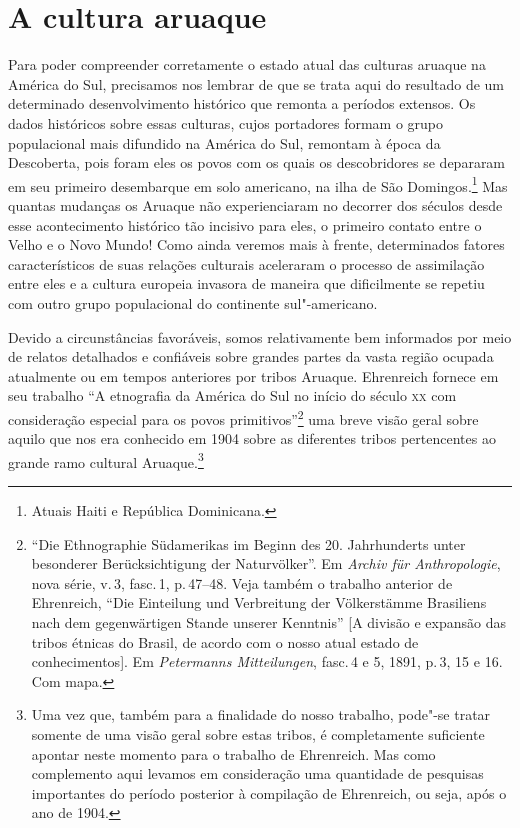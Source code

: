 
\chapter*{A cultura aruaque\smallskip{}}

Para poder compreender corretamente o estado atual das culturas aruaque
na América do Sul, precisamos nos lembrar de que se trata aqui do
resultado de um determinado desenvolvimento histórico que remonta a
períodos extensos. Os dados históricos sobre essas culturas, cujos
portadores formam o grupo populacional mais difundido na América do Sul,
remontam à época da Descoberta, pois foram eles os povos com os quais os
descobridores se depararam em seu primeiro desembarque em solo americano,
na ilha de São Domingos.\footnote{Atuais Haiti e República Dominicana.} Mas quantas mudanças os Aruaque não experienciaram no
decorrer dos séculos desde esse acontecimento histórico tão incisivo
para eles, o primeiro contato entre o Velho e o Novo Mundo! Como ainda veremos mais à frente,
determinados fatores característicos de suas relações culturais
aceleraram o processo de assimilação entre eles e a cultura europeia
invasora de maneira que dificilmente se repetiu com outro grupo
populacional do continente sul"-americano.

Devido a circunstâncias favoráveis, somos relativamente bem informados
por meio de relatos detalhados e confiáveis sobre grandes partes da
vasta região ocupada atualmente ou em tempos anteriores por tribos
Aruaque. Ehrenreich fornece em seu trabalho ``A etnografia da América do Sul no
início do século \textsc{xx} com consideração especial para os povos
primitivos''\footnote{``Die Ethnographie
Südamerikas im Beginn des 20. Jahrhunderts unter besonderer
Berücksichtigung der Naturvölker''. Em \textit{Archiv für Anthropologie}, nova série,
  v.\,3, fasc.\,1, p.\,47--48. Veja também o trabalho anterior de
  Ehrenreich, ``Die Einteilung und Verbreitung der Völkerstämme
  Brasiliens nach dem gegenwärtigen Stande unserer Kenntnis'' {[}A
  divisão e expansão das tribos étnicas do Brasil, de acordo com o nosso
  atual estado de conhecimentos{]}. Em \textit{Petermanns Mitteilungen},
  fasc.\,4 e 5, 1891, p.\,3, 15 e 16. Com mapa.} uma breve visão
geral sobre aquilo que nos era conhecido em 1904 sobre as diferentes
tribos pertencentes ao grande ramo cultural Aruaque.\footnote{Uma vez que, também
para a finalidade do nosso trabalho, pode"-se tratar somente de uma
visão geral sobre estas tribos, é completamente suficiente apontar neste
momento para o trabalho de Ehrenreich. Mas como complemento aqui
levamos em consideração uma quantidade de pesquisas importantes do
período posterior à compilação de Ehrenreich, ou seja, após o ano de
1904.}

